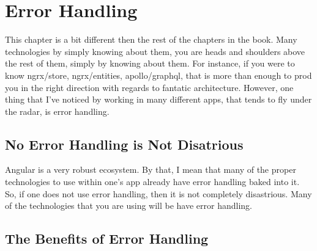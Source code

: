 \section{Error Handling}
\maketitle{}

This chapter is a bit different then the rest of the chapters in the book. Many
technologies by simply knowing about them, you are heads and shoulders above the
rest of them, simply by knowing about them. For instance, if you were to know
ngrx/store, ngrx/entities, apollo/graphql, that is more than enough to prod you
in the right direction with regards to fantatic architecture. However, one thing
that I've noticed by working in many different apps, that tends to fly under
the radar, is error handling.

\subsection{ No Error Handling is Not Disatrious }
Angular is a very robust ecosystem. By that, I mean that many of the proper
technologies to use within one's app already have error handling baked into it.
So, if one does not use error handling, then it is not completely disastrious.
Many of the technologies that you are using will be have error handling.

\subsection{ The Benefits of Error Handling }
